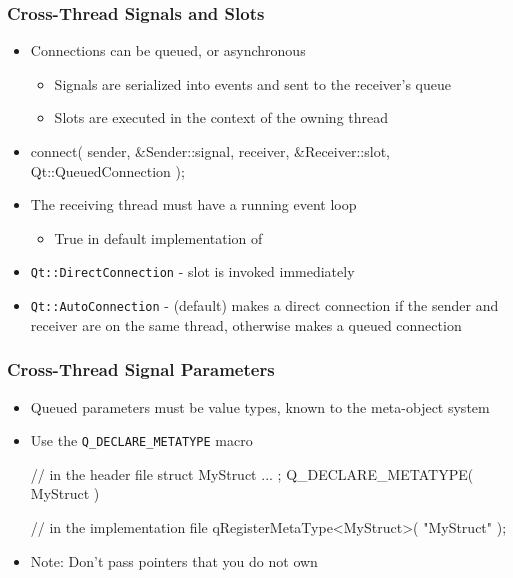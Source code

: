 \begin{slide}[fragile]
\frametitle{Cross-Thread Signals and Slots}

\begin{itemize}
\item Connections can be queued, or asynchronous
  \begin{itemize}
  \item Signals are serialized into events and sent to the receiver's queue
  \item Slots are executed in the context of the owning thread
  \end{itemize}
\item \begin{cpp}
connect( sender, &Sender::signal, receiver, &Receiver::slot,
         Qt::QueuedConnection );
\end{cpp}
\item The receiving thread must have a running event loop
  \begin{itemize}
  \item True in default implementation of 
  \end{itemize}
\item \texttt{Qt::DirectConnection} - slot is invoked immediately
\item \texttt{Qt::AutoConnection} - (default) makes a direct connection if the
sender and receiver are on the same thread, otherwise makes a queued connection
\end{itemize}

\end{slide}


\begin{slide}[fragile]
\frametitle{Cross-Thread Signal Parameters}

\begin{itemize}
\item Queued parameters must be value types, known to the meta-object system
\item Use the \texttt{Q\_DECLARE\_METATYPE} macro
\begin{cpp}
// in the header file
struct MyStruct
{
    ...
};
Q_DECLARE_METATYPE( MyStruct )

// in the implementation file
qRegisterMetaType<MyStruct>( "MyStruct" );
\end{cpp}
\item Note: Don't pass pointers that you do not own
\end{itemize}
\end{slide}

